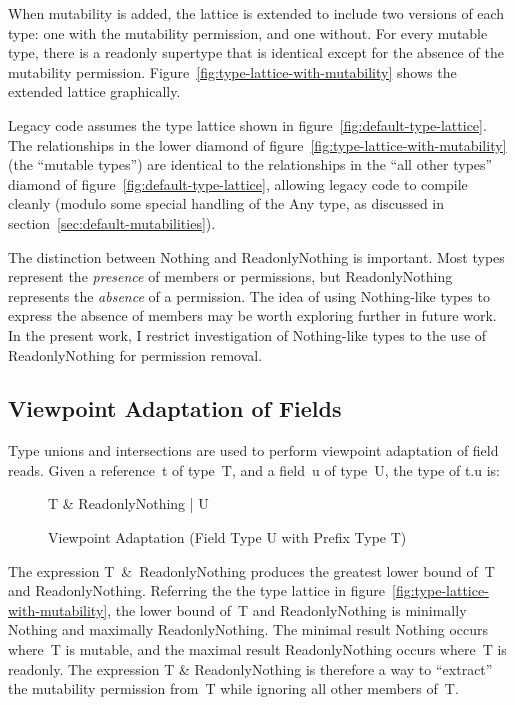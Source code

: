 When mutability is added, the lattice is extended to include two versions of each type: one with the mutability permission, and one without. For every mutable type, there is a readonly supertype that is identical except for the absence of the mutability permission. Figure~\ref{fig:type-lattice-with-mutability} shows the extended lattice graphically.

Legacy code assumes the type lattice shown in figure~\ref{fig:default-type-lattice}. The relationships in the lower diamond of figure~\ref{fig:type-lattice-with-mutability} (the ``mutable types'') are identical to the relationships in the ``all other types'' diamond of figure~\ref{fig:default-type-lattice}, allowing legacy code to compile cleanly (modulo some special handling of the {\cd Any} type, as discussed in section~\ref{sec:default-mutabilities}).

The distinction between {\cd Nothing} and {\cd ReadonlyNothing} is important. Most types represent the {\em presence} of members or permissions, but {\cd ReadonlyNothing} represents the {\em absence} of a permission. The idea of using {\cd Nothing}-like types to express the absence of members may be worth exploring further in future work. In the present work, I restrict investigation of {\cd Nothing}-like types to the use of {\cd ReadonlyNothing} for permission removal.



\subsection{Viewpoint Adaptation of Fields}

Type unions and intersections are used to perform viewpoint adaptation of field reads.
Given a reference~{\cd t} of type~{\cd T}, and a field~{\cd u} of type~{\cd U}, the type of \mbox{\cd t.u} is:
\begin{figure}[h]
\center
{\cd T \& ReadonlyNothing | U}
\caption{Viewpoint Adaptation (Field Type {\cd U} with Prefix Type {\cd T})}
\label{fig:viewpoint-adapted-type}
\end{figure}

The expression \mbox{\cd T \& ReadonlyNothing} produces the greatest lower bound of~{\cd T} and {\cd ReadonlyNothing}. Referring the the type lattice in figure~\ref{fig:type-lattice-with-mutability}, the lower bound of~{\cd T} and {\cd ReadonlyNothing} is minimally {\cd Nothing} and maximally {\cd ReadonlyNothing}. The minimal result {\cd Nothing} occurs where~{\cd T} is mutable, and the maximal result {\cd ReadonlyNothing} occurs where~{\cd T} is readonly. The expression {\cd T \& ReadonlyNothing} is therefore a way to ``extract'' the mutability permission from~{\cd T} while ignoring all other members of~{\cd T}.

